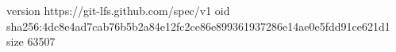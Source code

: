 version https://git-lfs.github.com/spec/v1
oid sha256:4dc8e4ad7cab76b5b2a84e12fc2ce86e899361937286e14ae0e5fdd91ce621d1
size 63507
